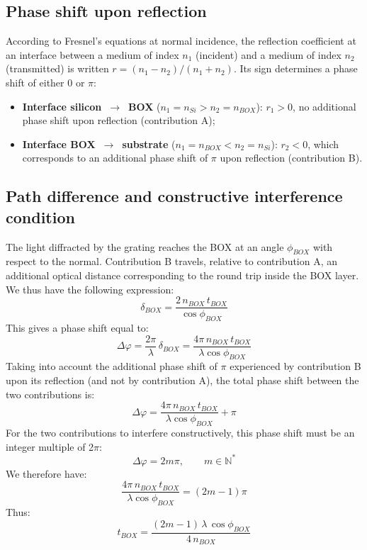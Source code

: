\documentclass[a4paper,11pt]{report}
\begin{document}
\subsection*{Phase shift upon reflection}

According to Fresnel's equations at normal incidence, the reflection coefficient at an interface between a medium of index $n_1$ (incident) and a medium of index $n_2$ (transmitted) is written $r=(n_1-n_2)/(n_1+n_2)$. Its sign determines a phase shift of either $0$ or $\pi$:

\begin{itemize}
    \item \textbf{Interface silicon~$\rightarrow$~BOX} ($n_1=n_{Si}>n_2=n_{BOX}$): $r_1>0$, no additional phase shift upon reflection (contribution A);
    \item \textbf{Interface BOX~$\rightarrow$~substrate} ($n_1=n_{BOX}<n_2=n_{Si}$): $r_2<0$, which corresponds to an additional phase shift of $\pi$ upon reflection (contribution B).
\end{itemize}

\subsection*{Path difference and constructive interference condition}

The light diffracted by the grating reaches the BOX at an angle $\phi_{BOX}$ with respect to the normal. Contribution B travels, relative to contribution A, an additional optical distance corresponding to the round trip inside the BOX layer. We thus have the following expression:
\begin{equation}
\delta_{BOX} = \frac{2\,n_{BOX}\,t_{BOX}}{\cos\phi_{BOX}}
\end{equation}
This gives a phase shift equal to:
\begin{equation}
\Delta\varphi = \dfrac{2\pi}{\lambda}\,\delta_{BOX} = \dfrac{4\pi\,n_{BOX}\,t_{BOX}}{\lambda\cos\phi_{BOX}}
\end{equation}
Taking into account the additional phase shift of $\pi$ experienced by contribution B upon its reflection (and not by contribution A), the total phase shift between the two contributions is:
\begin{equation}
\Delta\varphi = \frac{4\pi\,n_{BOX}\,t_{BOX}}{\lambda\cos\phi_{BOX}} + \pi
\end{equation}
For the two contributions to interfere constructively, this phase shift must be an integer multiple of 2$\pi$:
\begin{equation}
\Delta\varphi = 2m\pi, \qquad m\in\mathbb{N}^*
\end{equation}
We therefore have:
\begin{equation}
\frac{4\pi\,n_{BOX}\,t_{BOX}}{\lambda\cos\phi_{BOX}} = (2m-1)\pi
\end{equation}
Thus:
\begin{equation}
\boxed{t_{BOX} = \frac{(2m-1)\,\lambda\,\cos\phi_{BOX}}{4\,n_{BOX}}}
\label{eq:box_quarter_wave}
\end{equation}
\end{document}
